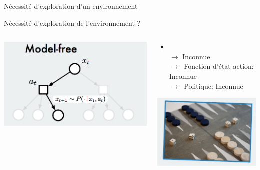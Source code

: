 \begin{frame}{Nécessité d'exploration d'un environnement}

    Nécessité d'exploration de l'environnement ?

\begin{columns}[T] %
\begin{column}{.48\textwidth}
\begin{center}
    \includegraphics[scale=.24]{./curiosity/2}
\end{center}
\end{column}%
\hfill%
\begin{column}{.58\textwidth}
\begin{itemize}
    \item {}\\$\rightarrow$ Inconnue \\ $\rightarrow\:$ Fonction d'état-action: Inconnue \\ $\rightarrow\:$ Politique: Inconnue
\end{itemize}

\begin{center}
    \includegraphics[scale=.3]{./curiosity/3}
\end{center}

\end{column}%
\end{columns}


\end{frame}
